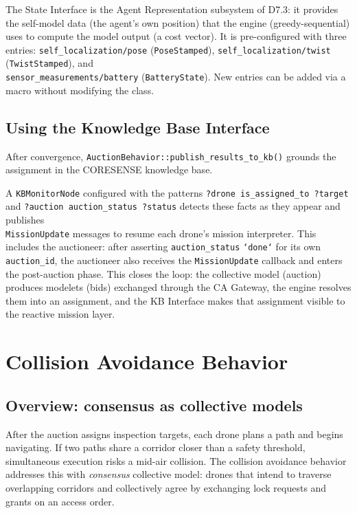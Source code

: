 \documentclass[deliverable]{csreport}
\renewcommand{\code}[1]{\texttt{\textcolor{CSMaroon}{#1}}}%
\begin{document}
The State Interface is the Agent Representation subsystem of D7.3: it provides the self-model data (the agent's own position) that the engine (greedy-sequential) uses to compute the model output (a cost vector). It is pre-configured with three entries: \code{self\_localization/pose} (\code{PoseStamped}), \code{self\_localization/twist} (\code{TwistStamped}), and \\ \code{sensor\_measurements/battery} (\code{BatteryState}). New entries can be added via a macro without modifying the class.

\section{Using the Knowledge Base Interface}

After convergence, \code{AuctionBehavior::publish\_results\_to\_kb()} grounds the assignment in the CORESENSE knowledge base.

A \code{KBMonitorNode} configured with the patterns \code{?drone is\_assigned\_to ?target} and \code{?auction auction\_status ?status} detects these facts as they appear and publishes \\ \code{MissionUpdate} messages to resume each drone's mission interpreter. This includes the auctioneer: after asserting \code{auction\_status} \texttt{`done`} for its own \code{auction\_id}, the auctioneer also receives the \code{MissionUpdate} callback and enters the post-auction phase. This closes the loop: the collective model (auction) produces modelets (bids) exchanged through the CA Gateway, the engine resolves them into an assignment, and the KB Interface makes that assignment visible to the reactive mission layer.



\chapter{Collision Avoidance Behavior}
\label{ch:ca_beh}

\section{Overview: consensus as collective models}

After the auction assigns inspection targets, each drone plans a path and begins navigating. If two paths share a corridor closer than a safety threshold, simultaneous execution risks a mid-air collision. The collision avoidance behavior addresses this with \emph{consensus} collective model: drones that intend to traverse overlapping corridors and collectively agree by exchanging lock requests and grants on an access order.
\end{document}
